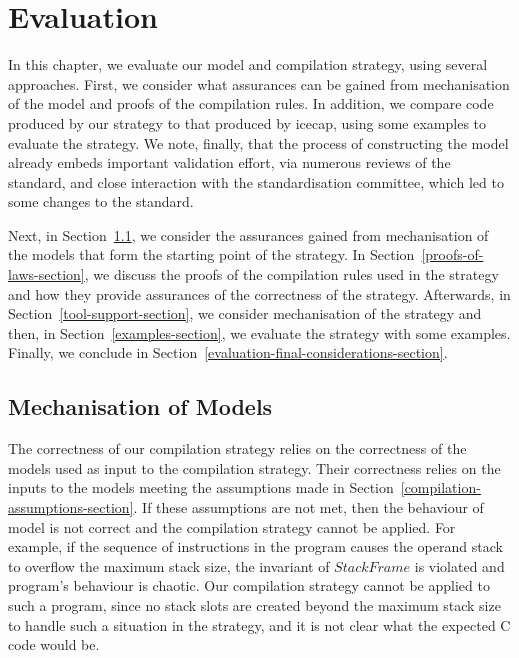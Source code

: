 \chapter{Evaluation}
\label{evaluation-chapter}

In this chapter, we evaluate our model and compilation strategy, using
several approaches.
First, we consider what assurances can be gained from mechanisation of
the model and proofs of the compilation rules.
In addition, we compare code produced by our strategy to that produced by
icecap, using some examples to evaluate the strategy.
We note, finally, that the process of constructing the model already
embeds important validation effort, via numerous reviews of the
standard, and close interaction with the standardisation committee,
which led to some changes to the standard.

Next, in Section~\ref{mechanisation-of-models-section}, we consider
the assurances gained from mechanisation of the models that form the
starting point of the strategy.
In Section~\ref{proofs-of-laws-section}, we discuss the proofs of the
compilation rules used in the strategy and how they provide assurances
of the correctness of the strategy.
Afterwards, in Section~\ref{tool-support-section}, we consider
mechanisation of the strategy and then, in
Section~\ref{examples-section}, we evaluate the strategy with some
examples.
Finally, we conclude in
Section~\ref{evaluation-final-considerations-section}.


\section{Mechanisation of Models}
\label{mechanisation-of-models-section}

The correctness of our compilation strategy relies on the correctness
of the models used as input to the compilation strategy.
Their correctness relies on the inputs to the models meeting the
assumptions made in Section~\ref{compilation-assumptions-section}.
If these assumptions are not met, then the behaviour of model is not
correct and the compilation strategy cannot be applied.
For example, if the sequence of instructions in the program causes the
operand stack to overflow the maximum stack size, the invariant of
$StackFrame$ is violated and program's behaviour is chaotic.
Our compilation strategy cannot be applied to such a program, since no
stack slots are created beyond the maximum stack size to handle such a
situation in the strategy, and it is not clear what the expected C
code would be.

